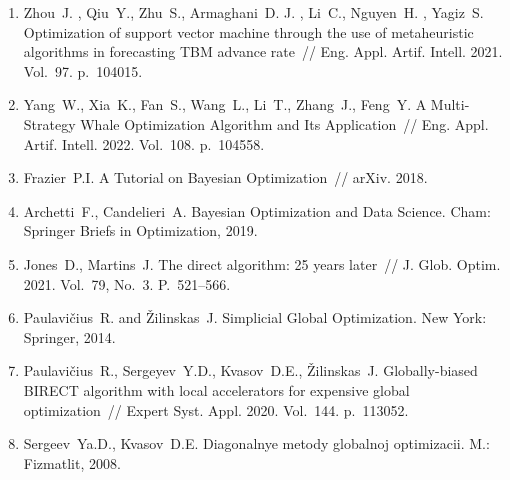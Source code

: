 \documentclass[a4paper,12pt,russian]{article}
\begin{document}
\begin{enumerate}
\item \label{rfa:enlit:Zhou2021}
Zhou~J. , Qiu~Y.,  Zhu~S., Armaghani~D. J. , Li~C., Nguyen~H. , Yagiz~S. Optimization of support vector machine through the use of metaheuristic algorithms in forecasting {TBM} advance rate~// Eng. Appl. Artif. Intell. 2021. Vol.~97. p.~104015.  %

\item \label{rfa:enlit:Yang2022}
Yang~W., Xia~K., Fan~S., Wang~L., Li~T., Zhang~J., Feng~Y. A Multi-Strategy Whale Optimization Algorithm and Its Application~// Eng. Appl. Artif. Intell. 2022. Vol.~108. p.~104558. %

\item \label{rfa:enlit:Frazier2018}
Frazier~P.I. A Tutorial on Bayesian Optimization~// arXiv. 2018. %

\item \label{rfa:enlit:Archetti2019}
Archetti~F., Candelieri~A. Bayesian Optimization and Data Science. Cham: Springer Briefs in Optimization, 2019. %

\item \label{rfa:enlit:Jones2021}
Jones~D., Martins~J. The direct algorithm: 25 years later~// J. Glob. Optim. 2021. Vol.~79, No.~3. P.~521--566. %

\item \label{rfa:enlit:PaulaviciusZilinskas2014}
Paulavi{\v c}ius~R. and {\v Z}ilinskas~J. Simplicial Global Optimization. New York: Springer, 2014. %

\item \label{rfa:enlit:Birect2020}
Paulavi{\v c}ius~R., Sergeyev~Y.D., Kvasov~D.E., {\v Z}ilinskas~J. Globally-biased {BIRECT} algorithm with local accelerators for expensive global optimization~// 
Expert Syst. Appl. 2020. Vol.~144. p.~113052. %

\item \label{rfa:enlit:Sergeyev2017}
Sergeev~Ya.D., Kvasov~D.E. Diagonalnye metody globalnoj optimizacii.  M.: Fizmatlit, 2008. 


\end{enumerate}
\end{document}
